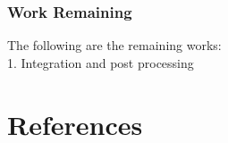 \subsection{Work Remaining}
The following are the remaining works:\\
1.	Integration and post processing\\

\chapter*{References}
%
%
%
%





